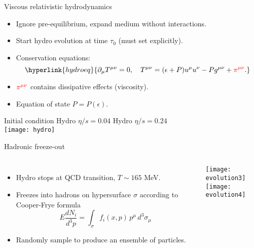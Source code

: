 \documentclass{beamer}
\begin{document}
\begin{frame}[label=hydro]{Viscous relativistic hydrodynamics}
  \bgs

  \begin{itemize}
    \item Ignore pre-equilibrium, expand medium without interactions.
    \item Start hydro evolution at time $\tau_0$ (must set explicitly).
    \item Conservation equations:
      \begin{equation*}
        \hyperlink{hydroeq}{
        \partial_\mu T^{\mu\nu} = 0, \quad
        T^{\mu\nu} = (\epsilon + P) u^\mu u^\nu - P g^{\mu\nu} + {\color{red}\pi^{\mu\nu}}.
        }
      \end{equation*}
    \item $\color{red}\pi^{\mu\nu}$ contains dissipative effects (viscosity).
    \item Equation of state $P = P(\epsilon)$.
  \end{itemize}

  \mds

  \footnotesize \hspace{3.2em} Initial condition \hspace{1.5em} Hydro $\eta/s = 0.04$ \hspace{1.3em} Hydro $\eta/s = 0.24$ \\
  \texttt{[image: hydro]}
\end{frame}


\begin{frame}{Hadronic freeze-out}
  \begin{columns}
    \begin{itemize}
      \item Hydro stops at QCD transition, $T \sim 165$ MeV.
      \item Freezes into hadrons on hypersurface $\sigma$ according to Cooper-Frye formula
        \begin{equation*}
          E \frac{dN_i}{d^3p} = \int_\sigma f_i(x,p) \, p^\mu \, d^3\sigma_\mu
        \end{equation*}
      \item Randomly sample to produce an ensemble of particles.
    \end{itemize}

    \centering
    \texttt{[image: evolution3]} \\
    \texttt{[image: evolution4]}
  \end{columns}


\end{frame}
\end{document}
